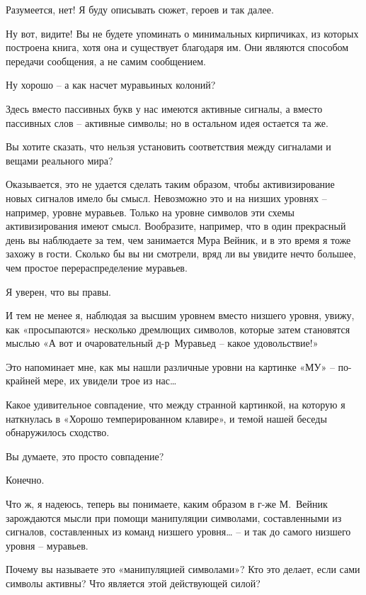 \documentclass[../main.tex]{subfiles}
\begin{document}
\begin{dialogue}
 Разумеется, нет! Я буду описывать сюжет, героев и так далее.

 Ну вот, видите! Вы не будете упоминать о минимальных кирпичиках, из которых построена книга, хотя она и существует благодаря им. Они являются способом передачи сообщения, а не самим сообщением.

 Ну хорошо \--- а как насчет муравьиных колоний?

 Здесь вместо пассивных букв у нас имеются активные сигналы, а вместо пассивных слов \--- активные символы; но в остальном идея остается та же.

 Вы хотите сказать, что нельзя установить соответствия между сигналами и вещами реального мира?

 Оказывается, это не удается сделать таким образом, чтобы активизирование новых сигналов имело бы смысл. Невозможно это и на низших уровнях \--- например, уровне муравьев. Только на уровне символов эти схемы активизирования имеют смысл. Вообразите, например, что в один прекрасный день вы наблюдаете за тем, чем занимается Мура Вейник, и в это время я тоже захожу в гости. Сколько бы вы ни смотрели, вряд ли вы увидите нечто большее, чем простое перераспределение муравьев.

 Я уверен, что вы правы.

 И тем не менее я, наблюдая за высшим уровнем вместо низшего уровня, увижу, как «просыпаются» несколько дремлющих символов, которые затем становятся мыслью «А вот и очаровательный д-р~Муравьед \--- какое удовольствие!»

 Это напоминает мне, как мы нашли различные уровни на картинке «МУ» \--- по-крайней мере, их увидели трое из нас\ldots{}

 Какое удивительное совпадение, что между странной картинкой, на которую я наткнулась в «Хорошо темперированном клавире», и темой нашей беседы обнаружилось сходство.

 Вы думаете, это просто совпадение?

 Конечно.

 Что ж, я надеюсь, теперь вы понимаете, каким образом в г-же М.~Вейник зарождаются мысли при помощи манипуляции символами, составленными из сигналов, составленных из команд низшего уровня\ldots{} \--- и так до самого низшего уровня \--- муравьев.

 Почему вы называете это «манипуляцией символами»? Кто это делает, если сами символы активны? Что является этой действующей силой?


\end{dialogue}
\end{document}
